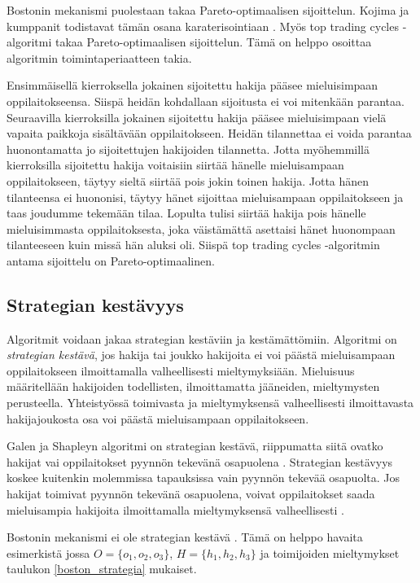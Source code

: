 \documentclass[gradu, twoside]{tktltiki}
\begin{document}
\enlargethispage{\baselineskip}
Bostonin mekanismi puolestaan takaa Pareto-optimaalisen sijoittelun.
Kojima ja kumppanit todistavat tämän osana karaterisointiaan
\cite{kojima10}. Myös top trading cycles -algoritmi takaa
Pareto-optimaalisen sijoittelun. Tämä on helppo osoittaa algoritmin
toimintaperiaatteen takia.

Ensimmäisellä kierroksella jokainen sijoitettu hakija pääsee
mieluisimpaan oppilaitokseensa. Siispä heidän kohdallaan sijoitusta ei
voi mitenkään parantaa. Seuraavilla kierroksilla jokainen sijoitettu
hakija pääsee mieluisimpaan vielä vapaita paikkoja sisältävään
oppilaitokseen. Heidän tilannettaa ei voida parantaa huonontamatta jo
sijoitettujen hakijoiden tilannetta. Jotta myöhemmillä kierroksilla
sijoitettu hakija voitaisiin siirtää hänelle mieluisampaan
oppilaitokseen, täytyy sieltä siirtää pois jokin toinen hakija. Jotta
hänen tilanteensa ei huononisi, täytyy hänet sijoittaa mieluisampaan
oppilaitokseen ja taas joudumme tekemään tilaa. Lopulta tulisi siirtää
hakija pois hänelle mieluisimmasta oppilaitoksesta, joka väistämättä
asettaisi hänet huonompaan tilanteeseen kuin missä hän aluksi oli.
Siispä top trading cycles -algoritmin antama sijoittelu on
Pareto-optimaalinen.

\subsection{Strategian kestävyys}

Algoritmit voidaan jakaa strategian kestäviin ja kestämättömiin.
Algoritmi on \emph{strategian kestävä}, jos hakija tai joukko
hakijoita ei voi päästä mieluisampaan oppilaitokseen ilmoittamalla
valheellisesti mieltymyksiään. Mieluisuus määritellään hakijoiden
todellisten, ilmoittamatta jääneiden, mieltymysten perusteella.
Yhteistyössä toimivasta ja mieltymyksensä valheellisesti ilmoittavasta
hakijajoukosta osa voi päästä mieluisampaan oppilaitokseen.

Galen ja Shapleyn algoritmi on strategian kestävä, riippumatta siitä
ovatko hakijat vai oppilaitokset pyynnön tekevänä osapuolena
\cite{dubins81}. Strategian kestävyys koskee kuitenkin molemmissa
tapauksissa vain pyynnön tekevää osapuolta. Jos hakijat toimivat
pyynnön tekevänä osapuolena, voivat oppilaitokset saada mieluisampia
hakijoita ilmoittamalla mieltymyksensä valheellisesti \cite{dubins81}.

\enlargethispage{\baselineskip}
Bostonin mekanismi ei ole strategian kestävä \cite{abdusön03}. Tämä on
helppo havaita esimerkistä jossa $O = \{o_1, o_2, o_3\}$, $H = \{h_1,
h_2, h_3\}$ ja toimijoiden mieltymykset taulukon
\ref{boston_strategia} mukaiset.
\end{document}
